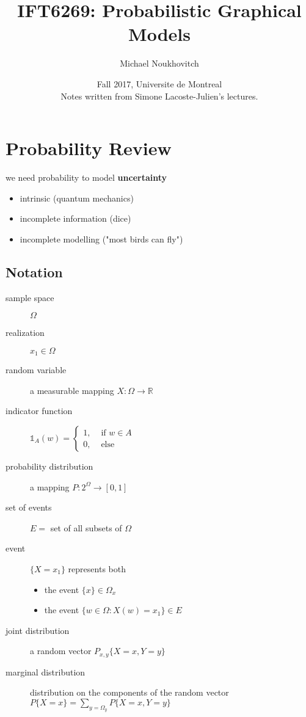 \documentclass[]{article}
\theoremstyle{definition}
\newcommand{\1}[1]{\mathds{1}_#1}
\begin{document}
	\let\ref\Cref

	\title{\bf{IFT6269: Probabilistic Graphical Models}}
	\date{Fall 2017, Universite de Montreal \\ \center Notes written from Simone Lacoste-Julien's lectures.}
	\author{Michael Noukhovitch}

	\maketitle
	\newpage
	\tableofcontents
	\newpage
	
	\section{Probability Review}
	\label{sec:probability_review}

	we need probability to model \textbf{uncertainty}
	\begin{itemize}
		\item intrinsic (quantum mechanics)
		\item incomplete information (dice)
		\item incomplete modelling ("most birds can fly")
	\end{itemize}

	\subsection{Notation}
	\label{sub:notation}
	
	\begin{description}
		\item[sample space] $\Omega$
		\item[realization] $x_1 \in \Omega$
		\item[random variable] a measurable mapping $X: \Omega \rightarrow \mathbb{R}$ 
		\item[indicator function] $\1{A}(w) = \begin{cases}
				1, &\text{ if } w \in A \\
				0, &\text{ else}	
			\end{cases}$
		\item[probability distribution] a mapping $P: 2^\Omega \rightarrow [0,1]$
		\item[set of events] $E = $ set of all subsets of $\Omega$
		\item[event] $\{ X = x_1\}$ represents both 
			\begin{itemize}
				\item the event $\{ x \} \in \Omega_x$ 
				\item the event $\{ w \in \Omega : X(w) = x_1 \} \in E$
			\end{itemize}  
		\item[joint distribution] a random vector $P_{x,y}\{X=x,Y=y\}$ 
		\item[marginal distribution] distribution on the components of the random vector  \\ 
			$P\{X = x \} = \sum_{y = \Omega_y} P\{X = x, Y = y \}$  \\ 
	\end{description}
\end{document}
